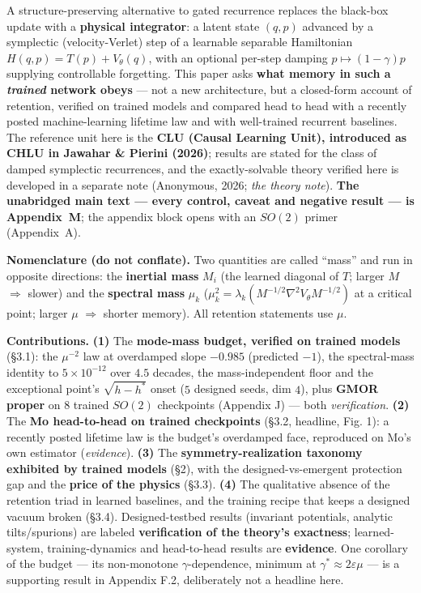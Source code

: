 \documentclass[10pt]{article}
\begin{document}
A structure-preserving alternative to gated recurrence replaces the black-box update with a \textbf{physical integrator}: a latent state $(q,p)$ advanced by a symplectic (velocity-Verlet) step of a learnable separable Hamiltonian $H(q,p)=T(p)+V_\theta(q)$, with an optional per-step damping $p\mapsto(1-\gamma)p$ supplying controllable forgetting. This paper asks \textbf{what memory in such a \emph{trained} network obeys} --- not a new architecture, but a closed-form account of retention, verified on trained models and compared head to head with a recently posted machine-learning lifetime law and with well-trained recurrent baselines. The reference unit here is the \textbf{CLU (Causal Learning Unit), introduced as CHLU in Jawahar \& Pierini (2026)}; results are stated for the class of damped symplectic recurrences, and the exactly-solvable theory verified here is developed in a separate note (Anonymous, 2026; \emph{the theory note}). \textbf{The unabridged main text --- every control, caveat and negative result --- is Appendix~M}; the appendix block opens with an $SO(2)$ primer (Appendix~A).

\textbf{Nomenclature (do not conflate).} Two quantities are called ``mass'' and run in opposite directions: the \textbf{inertial mass} $M_i$ (the learned diagonal of $T$; larger $M$ $\Rightarrow$ slower) and the \textbf{spectral mass} $\mu_k$ ($\mu_k^2=\lambda_k(M^{-1/2}\nabla^2V_\theta M^{-1/2})$ at a critical point; larger $\mu$ $\Rightarrow$ shorter memory). All retention statements use $\mu$.

\textbf{Contributions.} \textbf{(1)} The \textbf{mode-mass budget, verified on trained models} (\S3.1): the $\mu^{-2}$ law at overdamped slope $-0.985$ (predicted $-1$), the spectral-mass identity to $5\!\times\!10^{-12}$ over $4.5$ decades, the mass-independent floor and the exceptional point's $\sqrt{h-h^*}$ onset ($5$ designed seeds, dim $4$), plus \textbf{GMOR proper} on $8$ trained $SO(2)$ checkpoints (Appendix J) --- both \emph{verification}. \textbf{(2)} The \textbf{Mo head-to-head on trained checkpoints} (\S3.2, headline, Fig. 1): a recently posted lifetime law is the budget's overdamped face, reproduced on Mo's own estimator (\emph{evidence}). \textbf{(3)} The \textbf{symmetry-realization taxonomy exhibited by trained models} (\S2), with the designed-vs-emergent protection gap and the \textbf{price of the physics} (\S3.3). \textbf{(4)} The qualitative absence of the retention triad in learned baselines, and the training recipe that keeps a designed vacuum broken (\S3.4). Designed-testbed results (invariant potentials, analytic tilts/spurions) are labeled \textbf{verification of the theory's exactness}; learned-system, training-dynamics and head-to-head results are \textbf{evidence}. One corollary of the budget --- its non-monotone $\gamma$-dependence, minimum at $\gamma^*\approx2\varepsilon\mu$ --- is a supporting result in Appendix F.2, deliberately not a headline here.
\end{document}
